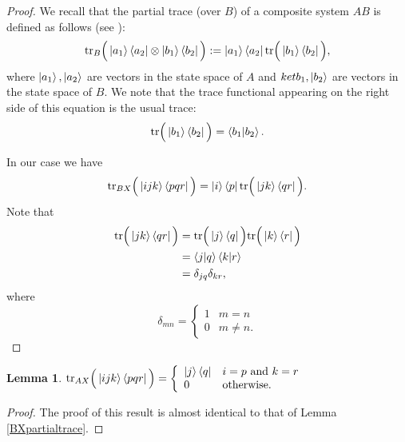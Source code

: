 \documentclass[reqno]{amsart}
\newtheorem{lemma}{Lemma}
\numberwithin{lemma}{section}
\numberwithin{proposition}{section}
\newcommand{\tr}{\textnormal{tr}}
\begin{document}
\begin{proof}
We recall that the partial trace (over $B$) of a composite system $AB$ is defined as follows (see \cite{nielsen_chuang}):
\begin{equation*}
\tr_{B}\Big ( \ket{a_{1}} \bra{a_{2}} \otimes \ket{b_{1}} \bra{b_{2}} \Big ) :=
\ket{a_{1}} \bra{a_{2}} \tr \Big ( \ket{b_{1}} \bra{b_{2}} \Big ),
\end{equation*}
where $\ket{a_{1}}, \ket{a_{2}}$ are vectors in the state space of $A$ and $ket{b_{1}}, \ket{b_{2}}$ are vectors in the state space of $B$. We note that the trace functional appearing on the right side of this equation is the usual trace:
\begin{equation*}
\tr \Big ( \ket{b_{1}} \bra{b_{2}} \Big ) = \braket{b_{1} \vert b_{2}}.
\end{equation*}

In our case we have
\begin{equation*}
\tr_{BX} \Big ( \ket{ijk}\bra{pqr} \Big ) = \ket{i} \bra{p} \tr \Big ( \ket{jk} \bra{qr} \Big ).
\end{equation*}
Note that
\begin{align*}
\tr \Big ( \ket{jk}\bra{qr} \Big ) &= \tr \Big ( \ket{j} \bra{q} \Big ) \tr \Big ( \ket{k} \bra{r} \Big )\\
&= \braket{j \vert q} \braket{k \vert r}\\
&= \delta_{jq} \delta_{kr},
\end{align*}
where 
\begin{equation*}
\delta_{mn} = \left \{ \begin{array}{ll}
1 & m = n\\
0 & m \neq n.
\end{array}
\right .
\end{equation*}
\end{proof}

\begin{lemma}
\label{AXpartialtrace}
$\displaystyle \tr_{AX} \Big ( \ket{ijk}\bra{pqr} \Big )
= \left \{ \begin{array}{ll}
\ket{j}\bra{q} & i = p \ \textnormal{and} \ k = r\\
0 & \textnormal{otherwise}.
\end{array}
\right .
$
\end{lemma}

\begin{proof}
The proof of this result is almost identical to that of Lemma \ref{BXpartialtrace}.
\end{proof}
\end{document}
